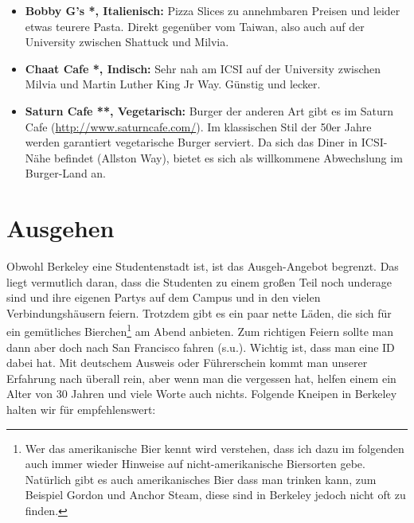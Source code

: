 \documentclass[a4paper]{scrreprt}
\begin{document}
\begin{itemize}
	\item \textbf{Bobby G's *, Italienisch:} Pizza Slices zu annehmbaren Preisen und leider etwas teurere Pasta. Direkt gegenüber vom Taiwan, also auch auf der University zwischen Shattuck und Milvia.
  
  \item \textbf{Chaat Cafe *, Indisch:} Sehr nah am ICSI auf der University zwischen Milvia und Martin Luther King Jr Way. Günstig und lecker.   
  
  \item \textbf{Saturn Cafe **, Vegetarisch:} Burger der anderen Art gibt es im Saturn Cafe (\url{http://www.saturncafe.com/}). Im klassischen Stil der 50er Jahre werden garantiert vegetarische Burger serviert. Da sich das Diner in ICSI-Nähe befindet (Allston Way), bietet es sich als willkommene Abwechslung im Burger-Land an.

\end{itemize}

\section{Ausgehen}

Obwohl Berkeley eine Studentenstadt ist, ist das Ausgeh-Angebot begrenzt. Das liegt vermutlich daran, dass die Studenten zu einem großen Teil noch underage sind und ihre eigenen Partys auf dem Campus und in den vielen Verbindungshäusern feiern. Trotzdem gibt es ein paar nette Läden, die sich für ein gemütliches Bierchen\footnote{Wer das amerikanische Bier kennt wird verstehen, dass ich dazu im folgenden auch immer wieder Hinweise auf nicht-amerikanische Biersorten gebe. Natürlich gibt es auch amerikanisches Bier dass man trinken kann, zum Beispiel Gordon und Anchor Steam, diese sind in Berkeley jedoch nicht oft zu finden.} am Abend anbieten.  Zum richtigen Feiern sollte man dann aber doch nach San Francisco fahren (s.u.). Wichtig ist, dass man eine ID dabei hat. Mit deutschem Ausweis oder Führerschein kommt man unserer Erfahrung nach überall rein, aber wenn man die vergessen hat, helfen einem ein Alter von 30 Jahren und viele Worte auch nichts. Folgende Kneipen in Berkeley halten wir für empfehlenswert:
\end{document}
